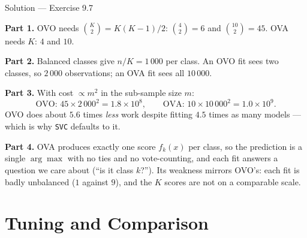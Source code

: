 \documentclass[aspectratio=169,11pt]{beamer}
\begin{document}
\begin{frame}{Solution --- Exercise 9.7}
\begin{solutionbox}
  \scriptsize
  \textbf{Part 1.} OVO needs $\binom{K}{2}=K(K-1)/2$: $\binom{4}{2}=6$ and
  $\binom{10}{2}=45$. OVA needs $K$: $4$ and $10$.

  \textbf{Part 2.} Balanced classes give $n/K = 1\,000$ per class. An OVO fit
  sees two classes, so $2\,000$ observations; an OVA fit sees all $10\,000$.

  \textbf{Part 3.} With cost $\propto m^2$ in the sub-sample size $m$:
  \[
    \text{OVO: } 45 \times 2\,000^2 = 1.8\times10^{8},
    \qquad
    \text{OVA: } 10 \times 10\,000^2 = 1.0\times10^{9} .
  \]
  OVO does about $5.6$ times \emph{less} work despite fitting $4.5$ times as
  many models --- which is why \texttt{SVC} defaults to it.

  \textbf{Part 4.} OVA produces exactly one score $f_k(x)$ per class, so the
  prediction is a single $\arg\max$ with no ties and no vote-counting, and each
  fit answers a question we care about (``is it class $k$?''). Its weakness
  mirrors OVO's: each fit is badly unbalanced ($1$ against $9$), and the $K$
  scores are not on a comparable scale.
\end{solutionbox}
\end{frame}

\section{Tuning and Comparison}
\end{document}
